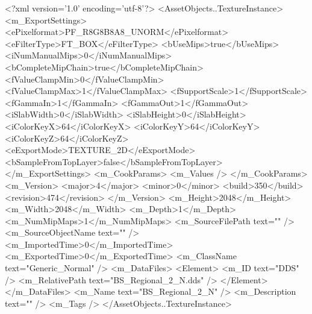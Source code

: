 <?xml version='1.0' encoding='utf-8'?>
<AssetObjects..TextureInstance>
  <m_ExportSettings>
    <ePixelformat>PF_R8G8B8A8_UNORM</ePixelformat>
    <eFilterType>FT_BOX</eFilterType>
    <bUseMips>true</bUseMips>
    <iNumManualMips>0</iNumManualMips>
    <bCompleteMipChain>true</bCompleteMipChain>
    <fValueClampMin>0</fValueClampMin>
    <fValueClampMax>1</fValueClampMax>
    <fSupportScale>1</fSupportScale>
    <fGammaIn>1</fGammaIn>
    <fGammaOut>1</fGammaOut>
    <iSlabWidth>0</iSlabWidth>
    <iSlabHeight>0</iSlabHeight>
    <iColorKeyX>64</iColorKeyX>
    <iColorKeyY>64</iColorKeyY>
    <iColorKeyZ>64</iColorKeyZ>
    <eExportMode>TEXTURE_2D</eExportMode>
    <bSampleFromTopLayer>false</bSampleFromTopLayer>
  </m_ExportSettings>
  <m_CookParams>
    <m_Values />
  </m_CookParams>
  <m_Version>
    <major>4</major>
    <minor>0</minor>
    <build>350</build>
    <revision>474</revision>
  </m_Version>
  <m_Height>2048</m_Height>
  <m_Width>2048</m_Width>
  <m_Depth>1</m_Depth>
  <m_NumMipMaps>1</m_NumMipMaps>
  <m_SourceFilePath text="" />
  <m_SourceObjectName text="" />
  <m_ImportedTime>0</m_ImportedTime>
  <m_ExportedTime>0</m_ExportedTime>
  <m_ClassName text="Generic_Normal" />
  <m_DataFiles>
    <Element>
      <m_ID text="DDS" />
      <m_RelativePath text="BS_Regional_2_N.dds" />
    </Element>
  </m_DataFiles>
  <m_Name text="BS_Regional_2_N" />
  <m_Description text="" />
  <m_Tags />
</AssetObjects..TextureInstance>